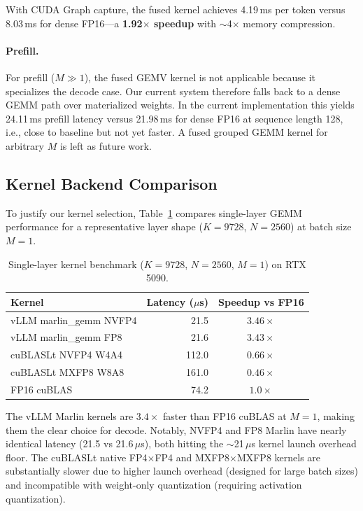 \documentclass{article}
\begin{document}
With CUDA Graph capture, the fused kernel achieves 4.19\,ms per token versus 8.03\,ms for dense FP16---a \textbf{1.92$\times$ speedup} with $\sim$4$\times$ memory compression.

\paragraph{Prefill.}
For prefill ($M \gg 1$), the fused GEMV kernel is not applicable because it specializes the decode case.
Our current system therefore falls back to a dense GEMM path over materialized weights.
In the current implementation this yields 24.11\,ms prefill latency versus 21.98\,ms for dense FP16 at sequence length 128, i.e., close to baseline but not yet faster.
A fused grouped GEMM kernel for arbitrary $M$ is left as future work.

\subsection{Kernel Backend Comparison}
\label{sec:kernels}

To justify our kernel selection, Table~\ref{tab:kernels} compares single-layer GEMM performance for a representative layer shape ($K=9728$, $N=2560$) at batch size $M=1$.

\begin{table}[t]
\centering
\caption{Single-layer kernel benchmark ($K=9728$, $N=2560$, $M=1$) on RTX 5090.}
\label{tab:kernels}
\begin{tabular}{lrc}
\toprule
\textbf{Kernel} & \textbf{Latency ($\mu$s)} & \textbf{Speedup vs FP16} \\
\midrule
vLLM marlin\_gemm NVFP4 & 21.5 & $3.46\times$ \\
vLLM marlin\_gemm FP8 & 21.6 & $3.43\times$ \\
cuBLASLt NVFP4 W4A4 & 112.0 & $0.66\times$ \\
cuBLASLt MXFP8 W8A8 & 161.0 & $0.46\times$ \\
FP16 cuBLAS & 74.2 & $1.0\times$ \\
\bottomrule
\end{tabular}
\end{table}

The vLLM Marlin kernels are $3.4\times$ faster than FP16 cuBLAS at $M=1$, making them the clear choice for decode.
Notably, NVFP4 and FP8 Marlin have nearly identical latency (21.5 vs 21.6\,$\mu$s), both hitting the $\sim$21\,$\mu$s kernel launch overhead floor.
The cuBLASLt native FP4$\times$FP4 and MXFP8$\times$MXFP8 kernels are substantially slower due to higher launch overhead (designed for large batch sizes) and incompatible with weight-only quantization (requiring activation quantization).
\end{document}
